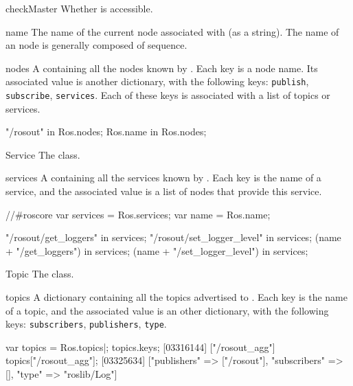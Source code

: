 \begin{urbiscriptapi}
\item[checkMaster]
  Whether  is accessible.


\item[name] The name of the current node associated with \urbi (as a
  string).  The name of an \urbi node is generally composed of
   sequence.


\item[nodes]%
  A  containing all the nodes known by
  . Each key is a node name. Its associated value is
  another dictionary, with the following keys: \lstinline{publish},
  \lstinline{subscribe}, \lstinline{services}.  Each of these keys is
  associated with a list of topics or services.
\begin{urbiassert}
"/rosout" in Ros.nodes;
Ros.name in Ros.nodes;
\end{urbiassert}


\item[Service]%
  The  class.


\item[services]%
  A  containing all the services known by
  . Each key is the name of a service, and the associated
  value is a list of nodes that provide this service.
\begin{urbiassert}
//#roscore
var services = Ros.services;
var name = Ros.name;

       "/rosout/get_loggers" in services;
  "/rosout/set_logger_level" in services;
     (name + "/get_loggers") in services;
(name + "/set_logger_level") in services;
\end{urbiassert}


\item[Topic]%
  The  class.


\item[topics]%
  A dictionary containing all the topics advertised to
  . Each key is the name of a topic, and the associated
  value is an other dictionary, with the following keys:
  \lstinline{subscribers}, \lstinline{publishers}, \lstinline{type}.
\begin{urbiscript}
var topics = Ros.topics|;
topics.keys;
[03316144] ["/rosout_agg"]
topics["/rosout_agg"];
[03325634] ["publishers" => ["/rosout"], "subscribers" => [], "type" => "roslib/Log"]
\end{urbiscript}
\end{urbiscriptapi}


